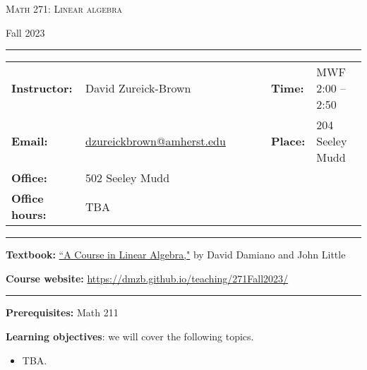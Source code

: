 \documentclass[12pt]{article}
\begin{document}
\begin{center}
{\Large \textsc{Math 271: Linear algebra}}
\end{center}
\begin{center}
Fall 2023
\end{center}


\begin{center}
\hrule
\begin{minipage}[t]{.75\textwidth}
\begin{tabular}{llcccll}
\textbf{Instructor:} & David Zureick-Brown & & &  & \textbf{Time:} & MWF 2:00 -- 2:50 \\
  \textbf{Email:} &  \href{mailto: dzureickbrown@amherst.edu}{dzureickbrown@amherst.edu} & & & & \textbf{Place:} & 204 Seeley Mudd \\
  \textbf{Office:} &  502 Seeley Mudd & & & &  & \\
  \textbf{Office hours:} &  TBA & & & &  & 
\end{tabular}
\end{minipage}
\hrule
\end{center}


\noindent\textbf{Textbook:}
\href{https://www.amazon.com/Course-Linear-Algebra-Dover-Mathematics/dp/0486469085}
{``A Course in Linear Algebra,"}  by David Damiano and John Little
\medskip

\noindent\textbf{Course website:} \url{https://dmzb.github.io/teaching/271Fall2023/}
\medskip

\hrule
\medskip

\noindent\textbf{Prerequisites:} Math 211
\smallskip


\noindent \textbf{Learning objectives}: we will cover the following topics.

 \begin{itemize}
 \item TBA.
 \end{itemize}
\end{document}
